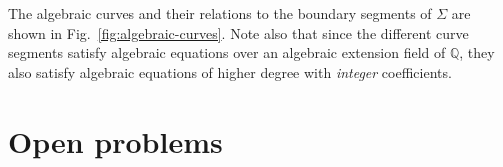 \documentclass[11pt]{article}
\begin{document}

The algebraic curves and their relations to the boundary segments of $\Sigma$ are shown in Fig.~\ref{fig:algebraic-curves}. Note also that since the different curve segments satisfy algebraic equations over an algebraic extension field of $\mathbb{Q}$, they also satisfy algebraic equations of higher degree with \emph{integer} coefficients.

\section{Open problems}

\label{sec:final-remarks}
\end{document}
